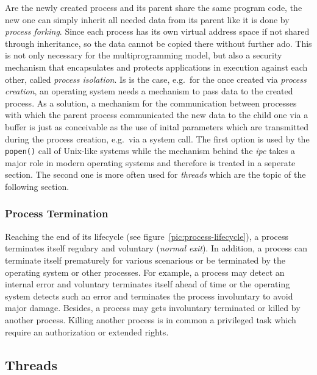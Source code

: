 Are the newly created process and its parent share the same program code, the new one can simply inherit all needed data from its parent like it is done by \textit{process forking}\cite{achilles2006betriebssysteme}.
Since each process has its own virtual address space if not shared through inheritance, so the data cannot be copied there without further ado.
This is not only necessary for the multiprogramming model, but also a security mechanism that encapsulates and protects applications in execution against each other, called \textit{process isolation}.
Is is the case, e.g.\ for the once created via \textit{process creation}, an operating system needs a mechanism to pass data to the created process.
As a solution, a mechanism for the communication between processes with which the parent process communicated the new data to the child one via a buffer is just as conceivable as the use of inital parameters which are transmitted during the process creation, e.g.\ via a system call\cite{glatz2015betriebssysteme}.
The first option is used by the \texttt{popen()} call of Unix-like systems while the mechanism behind the \textit{\ac{ipc}} takes a major role in modern operating systems and therefore is treated in a seperate section.
The second one is more often used for \textit{threads} which are the topic of the following section.

\subsubsection*{Process Termination}
Reaching the end of its lifecycle (see figure~\ref{pic:process-lifecycle}), a process terminates itself regulary and voluntary (\textit{normal exit})\cite{tanenbaum-modern-operating-systems}.
In addition, a process can terminate itself prematurely for various scenarious or be terminated by the operating system or other processes.
For example, a process may detect an internal error and voluntary terminates itself ahead of time or the operating system detects such an error and terminates the process involuntary to avoid major damage\cite{tanenbaum-modern-operating-systems}.
Besides, a process may gets involuntary terminated or killed by another process. 
Killing another process is in common a privileged task which require an authorization or extended rights\cite{tanenbaum-modern-operating-systems}.


\subsection{Threads}\label{sec:threads}

